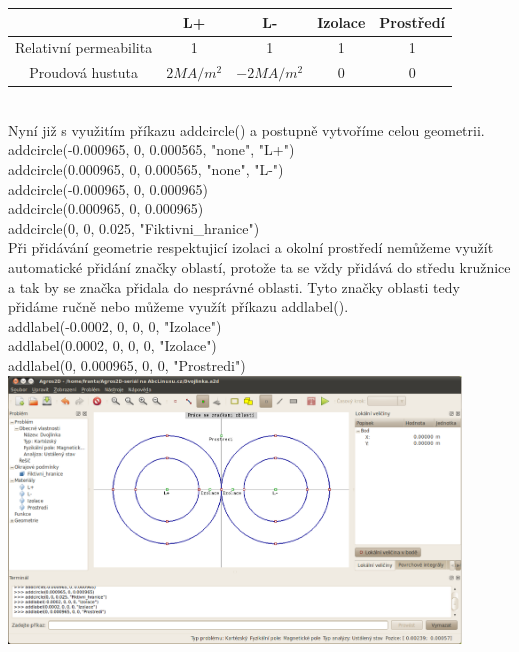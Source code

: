 \documentclass[a4paper, oneside]{article}
\begin{document}
\begin{tabular}{|c|c|c|c|c|}
\hline
 & L+ & L- & Izolace & Prostředí \\
\hline
Relativní permeabilita & 1 & 1 & 1 & 1\\
\hline
Proudová hustuta & $2 MA/m^2$ & $-2 MA/m^2$ & 0 & 0\\
\hline 
\end{tabular} \\
Nyní již s využitím příkazu addcircle() a postupně vytvoříme celou geometrii.\\
addcircle(-0.000965, 0, 0.000565, "none", "L+")\\
addcircle(0.000965, 0, 0.000565, "none", "L-")\\
addcircle(-0.000965, 0, 0.000965)\\
addcircle(0.000965, 0, 0.000965)\\
addcircle(0, 0, 0.025, "Fiktivni\_hranice")\\
Při přidávání geometrie respektujicí izolaci a okolní prostředí nemůžeme využít automatické přidání značky oblastí, protože ta se vždy přidává do středu kružnice a tak by se značka přidala do nesprávné oblasti. Tyto značky oblasti tedy přidáme ručně nebo můžeme využít příkazu addlabel().\\
addlabel(-0.0002, 0, 0, 0, "Izolace")\\
addlabel(0.0002, 0, 0, 0, "Izolace")\\
addlabel(0, 0.000965, 0, 0, "Prostredi")\\
\includegraphics[width=12cm]{Geometrie_druheho_problemu.eps}\\\
\end{document}
